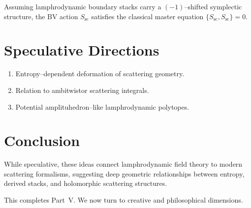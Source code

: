 \begin{proposition}[Heuristic]
Assuming lamphrodynamic boundary stacks carry a $(-1)$--shifted
symplectic structure, the BV action $S_{\mathrm{sc}}$ satisfies the
classical master equation $\{S_{\mathrm{sc}},S_{\mathrm{sc}}\}=0$.
\end{proposition}


\section{Speculative Directions}

\begin{enumerate}
\item Entropy--dependent deformation of scattering geometry.
\item Relation to ambitwistor scattering integrals.
\item Potential amplituhedron--like lamphrodynamic polytopes.
\end{enumerate}


\section{Conclusion}

While speculative, these ideas connect lamphrodynamic field theory to
modern scattering formalisms, suggesting deep geometric relationships
between entropy, derived stacks, and holomorphic scattering structures.

\medskip
\noindent
This completes Part~V. We now turn to creative and philosophical
dimensions.

\newpage

